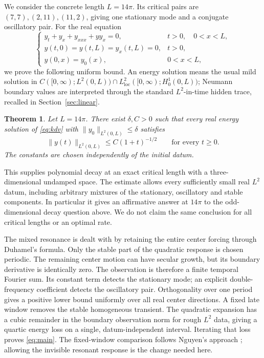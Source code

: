\documentclass[11pt]{article}
\newtheorem{theorem}{Theorem}[section]
\theoremstyle{remark}\newtheorem{remark}[theorem]{Remark}
\numberwithin{equation}{section}
\begin{document}
We consider the concrete length $L=14\pi$. Its critical pairs are
$(7,7),(2,11),(11,2)$, giving one stationary mode and a conjugate oscillatory
pair. For the real equation
\begin{equation}\label{eq:kdv}
 \begin{cases}
 y_t+y_x+y_{xxx}+yy_x=0,&t>0,\quad 0<x<L,\\
 y(t,0)=y(t,L)=y_x(t,L)=0,&t>0,\\
 y(0,x)=y_0(x),&0<x<L,
 \end{cases}
\end{equation}
we prove the following uniform bound. An energy solution means the usual
mild solution in
$C([0,\infty);L^2(0,L))\cap L^2_{\mathrm{loc}}([0,\infty);H^1_0(0,L))$;
Neumann boundary values are interpreted through the standard $L^2$-in-time
hidden trace, recalled in Section~\ref{sec:linear}.

\begin{theorem}\label{thm:main}
Let $L=14\pi$. There exist $\delta,C>0$ such that every real energy solution
of \eqref{eq:kdv} with $\|y_0\|_{L^2(0,L)}\le\delta$ satisfies
\begin{equation}\label{eq:main}
 \|y(t)\|_{L^2(0,L)}\le C(1+t)^{-1/2}\qquad\text{for every }t\ge0.
\end{equation}
The constants are chosen independently of the initial datum.
\end{theorem}

This supplies polynomial decay at an exact critical length with a
three-dimensional undamped space. The estimate allows every sufficiently
small real $L^2$ datum, including arbitrary mixtures of the stationary,
oscillatory and stable components. In particular it gives an affirmative
answer at $14\pi$ to the odd-dimensional decay question above. We do not
claim the same conclusion for all critical lengths or an optimal rate.

The mixed resonance is dealt with by retaining the entire center forcing
through Duhamel's formula. Only the stable part of the quadratic response is
chosen periodic. The remaining center motion can have secular growth, but
its boundary derivative is identically zero. The observation is therefore a
finite temporal Fourier sum. Its constant term detects the stationary mode;
an explicit double-frequency coefficient detects the oscillatory pair.
Orthogonality over one period gives a positive lower bound uniformly over
all real center directions. A fixed late window removes the stable
homogeneous transient. The quadratic expansion has a cubic remainder in the
boundary observation norm for rough $L^2$ data, giving a quartic energy loss
on a single, datum-independent interval. Iterating that loss proves
\eqref{eq:main}. The fixed-window comparison follows Nguyen's approach
\cite[Section 5]{Nguyen}; allowing the invisible resonant response is the
change needed here.
\end{document}
